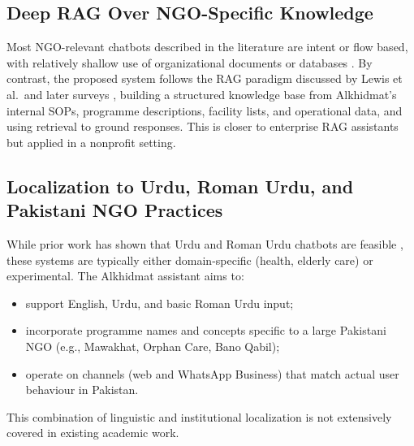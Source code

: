 \subsection{Deep RAG Over NGO-Specific Knowledge}
Most NGO-relevant chatbots described in the literature are intent or flow based, with relatively shallow use of organizational documents or databases \cite{folstad2018socialgood,mohiuddin2023multilingual}. By contrast, the proposed system follows the RAG paradigm discussed by Lewis et al.\ and later surveys \cite{lewis2020rag,gao2023ragsurvey,fan2024ragllm}, building a structured knowledge base from Alkhidmat’s internal SOPs, programme descriptions, facility lists, and operational data, and using retrieval to ground responses. This is closer to enterprise RAG assistants but applied in a nonprofit setting.

\subsection{Localization to Urdu, Roman Urdu, and Pakistani NGO Practices}
While prior work has shown that Urdu and Roman Urdu chatbots are feasible \cite{khan2020urdunlp,kumar2022saathi,mohiuddin2023multilingual,hakeem2025romanurdu}, these systems are typically either domain-specific (health, elderly care) or experimental. The Alkhidmat assistant aims to:
\begin{itemize}\setlength{\itemsep}{0pt}
    \item support English, Urdu, and basic Roman Urdu input;
    \item incorporate programme names and concepts specific to a large Pakistani NGO (e.g., Mawakhat, Orphan Care, Bano Qabil);
    \item operate on channels (web and WhatsApp Business) that match actual user behaviour in Pakistan.
\end{itemize}
This combination of linguistic and institutional localization is not extensively covered in existing academic work.

